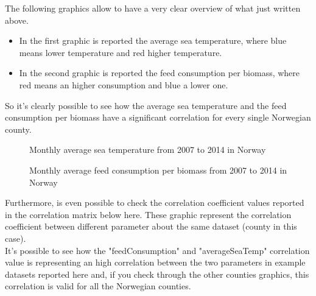 \newpage

The following graphics allow to have a very clear overview of what just written above.\\
\vspace{-10mm}
\begin{itemize}
 \setlength{\itemsep}{-5pt}
 \item In the first graphic is reported the average sea temperature, where blue means lower temperature and red higher temperature.
 \item In the second graphic is reported the feed consumption per biomass, where red means an higher consumption and blue a lower one.
\end{itemize}

So it's clearly possible to see how the average sea temperature and the feed consumption per biomass have a significant correlation for every single Norwegian county.

\begin{figure}[H]
    \caption{Monthly average sea temperature from 2007 to 2014 in Norway}
    \label{fig: Norway_averageSeaTemp}
\end{figure}

\begin{figure}[H]
    \caption{Monthly average feed consumption per biomass from 2007 to 2014 in Norway}
    \label{fig: Norway_feed-biomass}
\end{figure}

\newpage

Furthermore, is even possible to check the correlation coefficient values reported in the correlation matrix below here. These graphic represent the correlation coefficient between different parameter about the same dataset (county in this case).\\
It's possible to see how the "feedConsumption" and "averageSeaTemp" correlation value is representing an high correlation between the two parameters in example datasets reported here and, if you check through the other counties graphics, this correlation is valid for all the Norwegian counties.\\  \vspace{-15mm}

